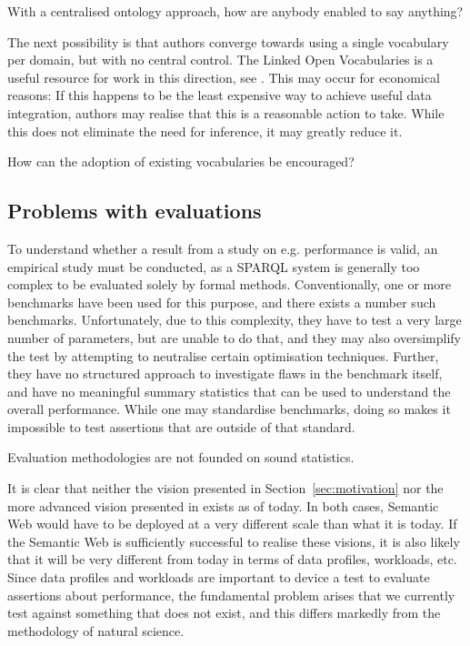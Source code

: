 \begin{problem}\label{prob:sayanything}
With a centralised ontology approach, how are anybody enabled to say
anything?
\end{problem}

The next possibility is that authors converge towards using a single
vocabulary per domain, but with no central control. The Linked Open
Vocabularies is a useful resource for work in this direction, see
\cite{lov2}. This may occur for economical reasons: If this happens to
be the least expensive way to achieve useful data integration, authors
may realise that this is a reasonable action to take. While this does
not eliminate the need for inference, it may greatly reduce it.

\begin{problem}\label{prob:useexist}
How can the adoption of existing vocabularies be encouraged? 
\end{problem}


\subsection{Problems with evaluations}\label{sec:evalproblems}

To understand whether a result from a study on e.g. performance is
valid, an empirical study must be conducted, as a SPARQL system is
generally too complex to be evaluated solely by formal
methods. Conventionally, one or more benchmarks have been used for
this purpose, and there exists a number such
benchmarks. Unfortunately, due to this complexity, they have to test a
very large number of parameters, but are unable to do that, and they
may also oversimplify the test by attempting to neutralise certain
optimisation techniques. Further, they have no structured approach to
investigate flaws in the benchmark itself, and have no meaningful
summary statistics that can be used to understand the overall
performance. While one may standardise benchmarks, doing so makes it
impossible to test assertions that are outside of that standard. 

\begin{problem}\label{prob:badstats}
Evaluation methodologies are not founded on sound statistics.
\end{problem}

It is clear that neither the vision presented in
Section~\ref{sec:motivation} nor the more advanced vision presented in
\cite{berners2001semantic} exists as of today. In both cases, Semantic
Web would have to be deployed at a very different scale than what it
is today. If the Semantic Web is sufficiently successful to realise
these visions, it is also likely that it will be very different from
today in terms of data profiles, workloads, etc. Since data profiles
and workloads are important to device a test to evaluate assertions
about performance, the fundamental problem arises that we currently
test against something that does not exist, and this differs markedly
from the methodology of natural science.

